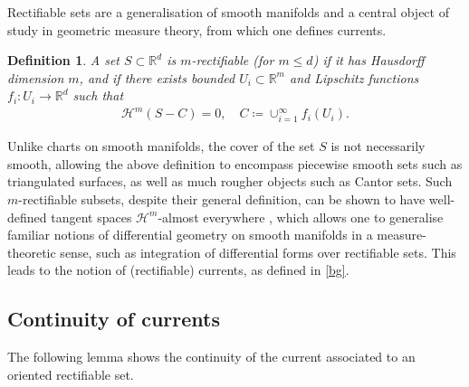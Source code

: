 \documentclass[sn-mathphys-num]{sn-jnl}%
\theoremstyle{thmstyleone}%
\newtheorem{lemma}[theorem]{Lemma}
\theoremstyle{thmstyletwo}%
\theoremstyle{thmstylethree}%
\newtheorem{definition}{Definition}%
\numberwithin{remark}{section}
\numberwithin{definition}{section}
\numberwithin{equation}{section}
\numberwithin{theorem}{section}
\newcommand{\R}{\ensuremath{\mathbb{R}}}%
\begin{document}
Rectifiable sets  are a generalisation of smooth manifolds and a central object of study in geometric measure theory, from which one defines currents. 
\begin{definition}
A set $S \subset \R^{d}$ is $m$-rectifiable (for $m\leq d$) if it has Hausdorff dimension $m$, and if there exists bounded $U_{i} \subset \R^{m}$ and Lipschitz functions $f_{i}: U_{i} \longrightarrow \R^{d}$ such that
\begin{align*}
    \mathcal{H}^{m}(S - C) = 0,\quad C\coloneq\cup_{i=1}^{\infty}{f_i(U_{i})}.
\end{align*}
\end{definition}
Unlike charts on smooth manifolds, the cover of the set $S$ is not necessarily smooth, allowing the above definition to encompass piecewise smooth sets such as triangulated surfaces, as well as much rougher objects such as Cantor sets. Such $m$-rectifiable subsets, despite their general definition, can be shown to have well-defined tangent spaces $\mathcal{H}^{m}$-almost everywhere \cite{NCpaper}, which allows one to generalise familiar notions of differential geometry on smooth manifolds in a measure-theoretic sense, such as integration of differential forms over rectifiable sets. This leads to the notion of (rectifiable) currents, as defined in \cref{bg}.

\subsection{Continuity of currents}

The following lemma shows the continuity of the current associated to an oriented rectifiable set.

\end{document}
